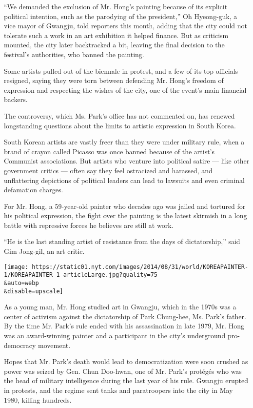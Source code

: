``We demanded the exclusion of Mr. Hong's painting because of its
explicit political intention, such as the parodying of the president,''
Oh Hyeong-guk, a vice mayor of Gwangju, told reporters this month,
adding that the city could not tolerate such a work in an art exhibition
it helped finance. But as criticism mounted, the city later backtracked
a bit, leaving the final decision to the festival's authorities, who
banned the painting.

Some artists pulled out of the biennale in protest, and a few of its top
officials resigned, saying they were torn between defending Mr. Hong's
freedom of expression and respecting the wishes of the city, one of the
event's main financial backers.

The controversy, which Ms. Park's office has not commented on, has
renewed longstanding questions about the limits to artistic expression
in South Korea.

South Korean artists are vastly freer than they were under military
rule, when a brand of crayon called Picasso was once banned because of
the artist's Communist associations. But artists who venture into
political satire --- like other
\href{http://www.nytimes.com/2012/08/13/world/asia/critics-see-south-korea-internet-curbs-as-censorship.html}{government
critics} --- often say they feel ostracized and harassed, and
unflattering depictions of political leaders can lead to lawsuits and
even criminal defamation charges.

For Mr. Hong, a 59-year-old painter who decades ago was jailed and
tortured for his political expression, the fight over the painting is
the latest skirmish in a long battle with repressive forces he believes
are still at work.

``He is the last standing artist of resistance from the days of
dictatorship,'' said Gim Jong-gil, an art critic.

\texttt{[image: https://static01.nyt.com/images/2014/08/31/world/KOREAPAINTER-1/KOREAPAINTER-1-articleLarge.jpg?quality=75\\\&auto=webp\\\&disable=upscale]}

As a young man, Mr. Hong studied art in Gwangju, which in the 1970s was
a center of activism against the dictatorship of Park Chung-hee, Ms.
Park's father. By the time Mr. Park's rule ended with his assassination
in late 1979, Mr. Hong was an award-winning painter and a participant in
the city's underground pro-democracy movement.

Hopes that Mr. Park's death would lead to democratization were soon
crushed as power was seized by Gen. Chun Doo-hwan, one of Mr. Park's
protégés who was the head of military intelligence during the last year
of his rule. Gwangju erupted in protests, and the regime sent tanks and
paratroopers into the city in May 1980, killing hundreds.

